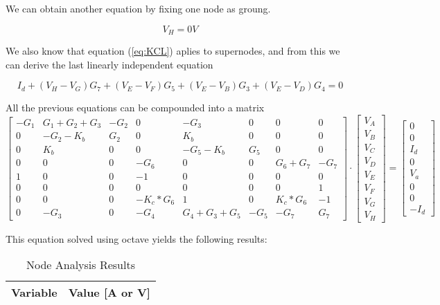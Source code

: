 We can obtain another equation by fixing one node as groung.

 \begin{equation}
  V_H = 0V
  \label{eq:supenodosGND}
\end{equation}

We also know that equation (\ref{eq:KCL}) aplies to supernodes, and from this we can derive the last linearly independent equation



 \begin{equation}
  I_d+(V_H-V_G)G_7+(V_E-V_F)G_5+(V_E-V_B)G_3+(V_E-V_D)G_4=0
  \label{eq:supenodosI}
\end{equation}

All the previous equations can be compounded into a matrix
  \begin{equation}\label{eq:matrixeqn2}
\begin{bmatrix}
    -G_1 & G_1+G_2+G_3 & -G_2 & 0 & -G_3 & 0 & 0 & 0\\
    0 & -G_2-K_b & G_2 & 0 & K_b & 0 & 0 & 0\\
    0 & K_b & 0 & 0 & -G_5-K_b & G_5 & 0 & 0\\
    0 & 0 & 0 & -G_6 & 0 & 0 & G_6+G_7 & -G_7\\
    1 & 0 & 0 & -1 & 0 & 0 & 0 & 0\\
    0 & 0 & 0 & 0 & 0 & 0 & 0 & 1\\
    0 & 0 & 0 & -K_c*G_6 & 1 & 0 & K_c*G_6 & -1\\
    0 & -G_3 & 0 & -G_4 & G_4+G_3+G_5 & -G_5 & -G_7 & G_7
\end{bmatrix}
\cdot
\begin{bmatrix}
V_A \\
V_B \\
V_C \\
V_D \\
V_E \\
V_F \\
V_G \\
V_H 
    \end{bmatrix}
=
    \begin{bmatrix}
0 \\
0 \\
I_d \\
0\\
V_a \\
0 \\
0 \\
-I_d
    \end{bmatrix}
  \end{equation}

This equation solved using octave yields the following results:

  \begin{table}[h]
    \centering
    \begin{tabular}{|l|r|}
      \hline    
      {\bf Variable} & {\bf Value [A or V]} \\ \hline
      
    \end{tabular}
    \caption{Node Analysis Results}
    \label{tab:nodeA}
  \end{table}

